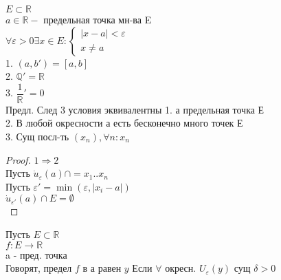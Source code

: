 $ E \subset \mathbb{R} $ \\
$ a \in \mathbb{R} - $ предельная точка мн-ва E \\
$ \forall \varepsilon > 0 \exists x \in E : \left\{ \begin{matrix}
|x-a| < \varepsilon \\
x \neq a 
\end{matrix}\right. 
$\\
1. $ (a, b') = [a, b] $ \\
2. $ \mathbb{Q}' =  \mathbb{R} $\\
3. $\dfrac{1}{\mathbb{R}}' = {0} $ \\
Предл. След 3 условия эквивалентны
1. а предельная точка Е \\
2. В любой окресности а есть бесконечно много точек Е \\
3. Сущ посл-ть $(x_n), \forall n : x_n$
\begin{proof}
	$ 1 \Rightarrow 2 $ \\
	Пусть $ \dot{u}_{\varepsilon} (a) \cap = {x_1 .. x_n} $ \\
	Пусть $ \varepsilon' = \min (\varepsilon, |x_i - a | ) $\\
	$ \dot{u}_{\varepsilon'} (a) \cap E = \emptyset $ \\
\end{proof}
Пусть $ E \subset \mathbb{R} $ \\
$ f : E \rightarrow \mathbb{R} $ \\
a - пред. точка \\
Говорят, предел $ f $ в а равен $y$ 
Если $ \forall $ окресн. $ U_{\varepsilon} (y) $ сущ $ \delta > 0 $ \\
